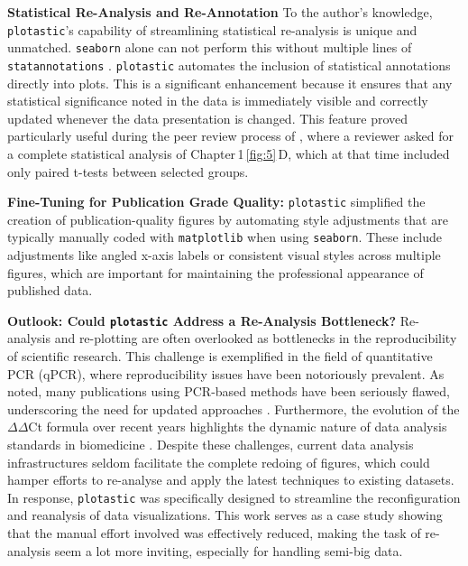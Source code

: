 \textbf{Statistical Re-Analysis and Re-Annotation}
To the author's knowledge, \texttt{plotastic}'s capability of streamlining
statistical re-analysis is unique and unmatched. \texttt{seaborn} alone can not
perform this without multiple lines of \texttt{statannotations}
\cite{charlierTrevismdStatannotationsV02022}. \texttt{plotastic} automates the
inclusion of statistical annotations directly into plots. This is a significant
enhancement because it ensures that any statistical significance noted in the
data is immediately visible and correctly updated whenever the data presentation
is changed. This feature proved particularly useful during the peer review
process of \citet{kuricModelingMyelomaDissemination2024}, where a reviewer asked
for a complete statistical analysis of Chapter\,1\,\ref{fig:5}\,D, which at that
time included only paired t-tests between selected groups.

\textbf{Fine-Tuning for Publication Grade Quality:}
\texttt{plotastic} simplified the creation of publication-quality figures by
automating style adjustments that are typically manually coded with
\texttt{matplotlib} when using \texttt{seaborn}. These include adjustments like
angled x-axis labels or consistent visual styles across multiple figures, which
are important for maintaining the professional appearance of published data.


\textbf{Outlook: Could \texttt{plotastic} Address a Re-Analysis Bottleneck?}
Re-analysis and re-plotting are often overlooked as bottlenecks in the
reproducibility of scientific research. This challenge is exemplified in the
field of quantitative PCR (qPCR), where reproducibility issues have been
notoriously prevalent. As \citet{bustinReproducibilityBiomedicalResearch2014}
noted, many publications using PCR-based methods have been seriously flawed,
underscoring the need for updated approaches
\cite{bustinNeedTransparencyGood2013, ruiz-villalbaUseMisuseCq2021}.
Furthermore, the evolution of the $\Delta\Delta$Ct formula over recent years
highlights the dynamic nature of data analysis standards in biomedicine
\cite{pfafflNewMathematicalModel2001a,
ramakersAssumptionfreeAnalysisQuantitative2003,
ruijterEfficiencyCorrectionRequired2021}. Despite these challenges, current data
analysis infrastructures seldom facilitate the complete redoing of figures,
which could hamper efforts to re-analyse and apply the latest techniques to
existing datasets. In response, \texttt{plotastic} was specifically designed to
streamline the reconfiguration and reanalysis of data visualizations. This work
serves as a case study showing that  the manual effort involved was effectively reduced, making the task
of re-analysis seem a lot more inviting, especially for handling semi-big data.





